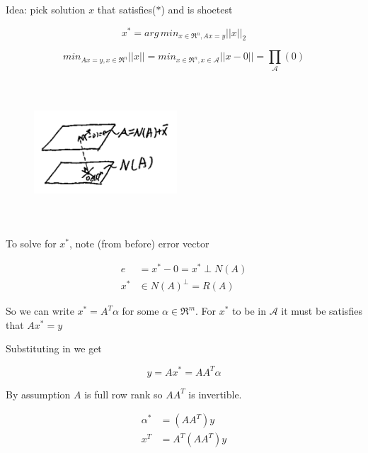 Idea: pick solution $x$ that satisfies($*$) and is shoetest

\begin{equation*}
x^* = arg \, min_{x\in \Re^n, Ax = y}||x||_2
\end{equation*}

\begin{equation*}
min_{Ax = y, x\in \Re^n}||x|| = min_{x\in \Re^n, x\in \mathcal{A}}||x - 0|| = \prod_{\mathcal{A}}(0)
\end{equation*}


\begin{figure}
	\centering
	\includegraphics[width=2.1in,height=2.1in]{figures/ch06/figure3.png}
\end{figure}

To solve for $x^*$, note (from before) error vector 

\begin{align*}
e &= x^* - 0 = x^* \perp N(A)\\
x^* &\in N(A)^{\perp} = R(A)
\end{align*}

So we can write $x^* = A^T\alpha$ for some $\alpha \in \Re^m$. 
For $x^*$ to be in $\mathcal{A}$ it must be satisfies that $Ax^* = y$

Substituting in we get 

\begin{equation*}
y = Ax^* = AA^T\alpha
\end{equation*}

By assumption $A$ is full row rank so $AA^T$ is invertible.

\begin{align*}
\alpha^* &= (AA^T)y\\
x^T &= A^T(AA^T)y
\end{align*}

